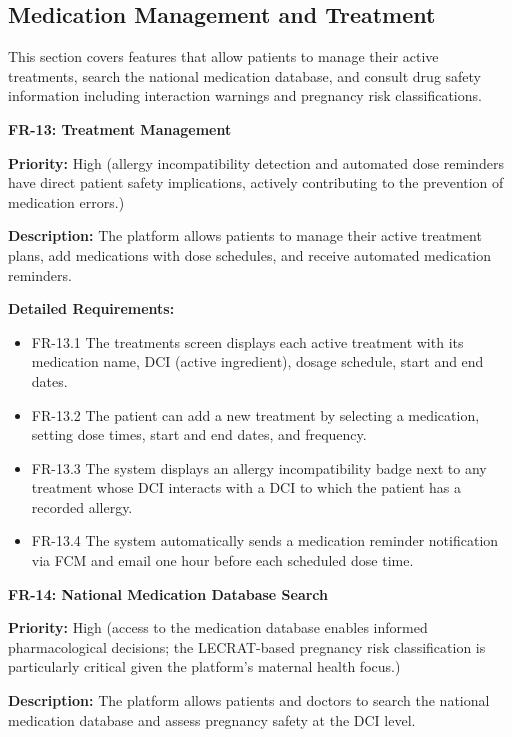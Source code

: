\subsection{Medication Management and Treatment}

This section covers features that allow patients to manage their active treatments,
search the national medication database, and consult drug safety information including
interaction warnings and pregnancy risk classifications.

\textbf{FR-13: Treatment Management}

\textbf{Priority:} High (allergy incompatibility detection and automated dose reminders have direct patient safety implications, actively contributing to the prevention of medication errors.)

\textbf{Description:} The platform allows patients to manage their active treatment plans,
add medications with dose schedules, and receive automated medication reminders.

\textbf{Detailed Requirements:}
\begin{itemize}
    \item FR-13.1 \; The treatments screen displays each active treatment with its
    medication name, DCI (active ingredient), dosage schedule, start and end dates.
    \item FR-13.2 \; The patient can add a new treatment by selecting a medication,
    setting dose times, start and end dates, and frequency.
    \item FR-13.3 \; The system displays an allergy incompatibility badge next to any
    treatment whose DCI interacts with a DCI to which the patient has a recorded allergy.
    \item FR-13.4 \; The system automatically sends a medication reminder notification
    via FCM and email one hour before each scheduled dose time.
\end{itemize}

\medskip

\textbf{FR-14: National Medication Database Search}

\textbf{Priority:} High (access to the medication database enables informed pharmacological decisions; the LECRAT-based pregnancy risk classification is particularly critical given the platform's maternal health focus.)

\textbf{Description:} The platform allows patients and doctors to search the national
medication database and assess pregnancy safety at the DCI level.


